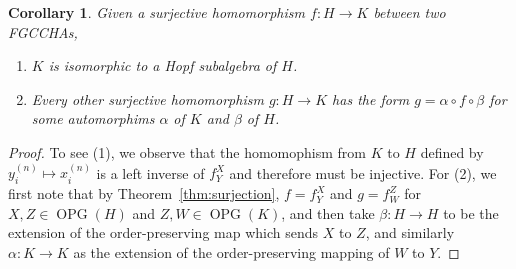 \documentclass[11pt]{amsart}
\newtheorem{corollary}[theorem]{Corollary}
\theoremstyle{definition}
\numberwithin{equation}{section}
\newcommand{\FGCCHAs}{\textsf{FGCCHA}s\xspace}
\newcommand{\OPG}{\operatorname{OPG}}
\begin{document}
\begin{corollary}
Given a surjective homomorphism $f: H \to K$ between two \FGCCHAs,
\begin{enumerate}
\item $K$ is isomorphic to a Hopf subalgebra of $H$.

\item Every other surjective homomorphism $g: H \to K$ has the form $g = \alpha \circ f \circ \beta$ for some automorphims $\alpha$ of $K$ and $\beta$ of $H$.

\end{enumerate}
\end{corollary}
\begin{proof}
To see (1), we observe that the homomophism from $K$ to $H$ defined by $y^{(n)}_{i} \mapsto x^{(n)}_{i}$ is a left inverse of $f^{X}_{Y}$ and therefore must be injective.  For (2), we first note that by Theorem~\ref{thm:surjection}, $f = f^{X}_{Y}$ and $g = f^{Z}_{W}$ for $X, Z \in \OPG(H)$ and $Z, W \in \OPG(K)$, and then take $\beta: H \to H$ to be the extension of the order-preserving map which sends $X$ to $Z$, and similarly $\alpha: K \to K$ as the extension of the order-preserving mapping of $W$ to $Y$.
\end{proof}
\end{document}
